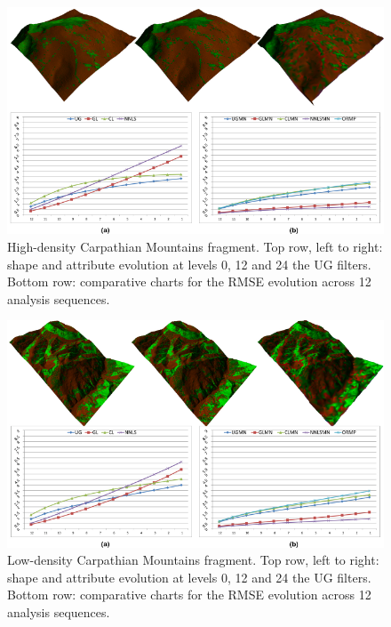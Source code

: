 \documentclass[graybox]{svmult}
\begin{document}
	\begin{figure}[!htbp]
		\centering
		\includegraphics{fundata_lod_rmse.pdf}
		
		\caption{\label{fig_cds:fundata_lod_rmse}%
			High-density Carpathian Mountains fragment.  Top row, left to right: shape and attribute evolution at levels 0, 12 and 24 the {UG} filters. Bottom row: comparative charts for the RMSE evolution across 12 analysis sequences. }
	\end{figure}
	
	\begin{figure}[!htbp]
		\centering
		\includegraphics{iezer_lod_rmse.pdf}
		
		\caption{\label{fig_cds:iezer_lod_rmse}%
			Low-density Carpathian Mountains fragment.  Top row, left to right: shape and attribute evolution at levels 0, 12 and 24 the {UG} filters. Bottom row: comparative charts for the RMSE evolution across 12 analysis sequences. }
	\end{figure}
	
\end{document}
